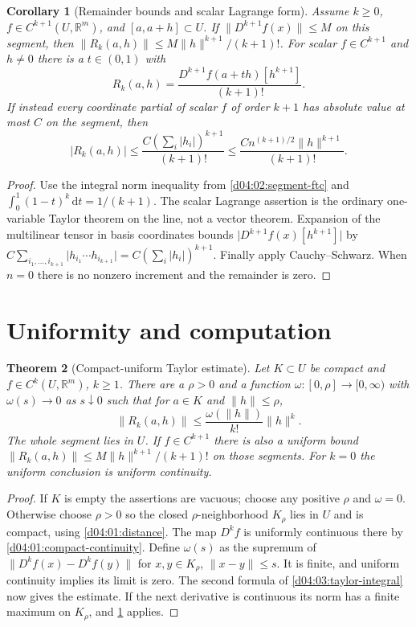 \documentclass[11pt,oneside,openany]{book}
\newtheorem{theorem}{Theorem}[chapter]
\newtheorem{corollary}[theorem]{Corollary}
\theoremstyle{definition}
\theoremstyle{remark}
\newcommand{\R}{\mathbb R}
\newcommand{\abs}[1]{\lvert#1\rvert}
\newcommand{\norm}[1]{\lVert#1\rVert}
\newcommand{\dd}{\,\mathrm d}
\newcommand{\family}[1]{}
\begin{document}
\begin{corollary}[Remainder bounds and scalar Lagrange form]\label{d04:03:taylor-bounds}
Assume $k\geq0$, $f\in C^{k+1}(U,\R^m)$, and $[a,a+h]\subset U$.
If $\norm{D^{k+1}f(x)}\leq M$ on this segment, then
$\norm{R_k(a,h)}\leq M\norm{h}^{k+1}/(k+1)!$.
For scalar $f\in C^{k+1}$ and $h\ne0$ there is a $t\in(0,1)$ with
\[
 R_k(a,h)=\frac{D^{k+1}f(a+th)[h^{k+1}]}{(k+1)!}.
\]
If instead every coordinate partial of scalar $f$ of order $k+1$ has
absolute value at most $C$ on the segment, then
\[
 \abs{R_k(a,h)}\leq
 \frac{C(\sum_i\abs{h_i})^{k+1}}{(k+1)!}
 \leq\frac{Cn^{(k+1)/2}\norm{h}^{k+1}}{(k+1)!}.
\]
\end{corollary}
\begin{proof}
Use the integral norm inequality from \cref{d04:02:segment-ftc} and
$\int_0^1(1-t)^k\dd t=1/(k+1)$. The scalar Lagrange assertion is the
ordinary one-variable Taylor theorem on the line, not a vector theorem.
Expansion of the multilinear tensor in basis coordinates bounds
$\abs{D^{k+1}f(x)[h^{k+1}]}$ by
$C\sum_{i_1,\ldots,i_{k+1}}\abs{h_{i_1}\cdots h_{i_{k+1}}}
=C(\sum_i\abs{h_i})^{k+1}$. Finally apply Cauchy--Schwarz.
When $n=0$ there is no nonzero increment and the remainder is zero.
\end{proof}

\section{Uniformity and computation}
\family{K04.03.07}\family{K04.03.08}

\begin{theorem}[Compact-uniform Taylor estimate]\label{d04:03:uniform-taylor}
Let $K\subset U$ be compact and $f\in C^k(U,\R^m)$, $k\geq1$.
There are a $\rho>0$ and a function $\omega:[0,\rho]\to[0,\infty)$
with $\omega(s)\to0$ as $s\downarrow0$ such that for $a\in K$ and
$\norm{h}\leq\rho$,
\[
 \norm{R_k(a,h)}\leq\frac{\omega(\norm{h})}{k!}\norm{h}^k.
\]
The whole segment lies in $U$. If $f\in C^{k+1}$ there is also a uniform
bound $\norm{R_k(a,h)}\leq M\norm{h}^{k+1}/(k+1)!$ on those segments.
For $k=0$ the uniform conclusion is uniform continuity.
\end{theorem}
\begin{proof}
If $K$ is empty the assertions are vacuous; choose any positive $\rho$
and $\omega=0$. Otherwise choose $\rho>0$ so the closed
$\rho$-neighborhood $K_\rho$ lies in $U$
and is compact, using \cref{d04:01:distance}. The map $D^kf$ is uniformly
continuous there by \cref{d04:01:compact-continuity}. Define $\omega(s)$
as the supremum of $\norm{D^kf(x)-D^kf(y)}$ for $x,y\in K_\rho$,
$\norm{x-y}\leq s$. It is finite, and uniform continuity implies its
limit is zero. The second formula of \cref{d04:03:taylor-integral} now
gives the estimate. If the next derivative is continuous its norm has a
finite maximum on $K_\rho$, and \cref{d04:03:taylor-bounds} applies.
\end{proof}
\end{document}
